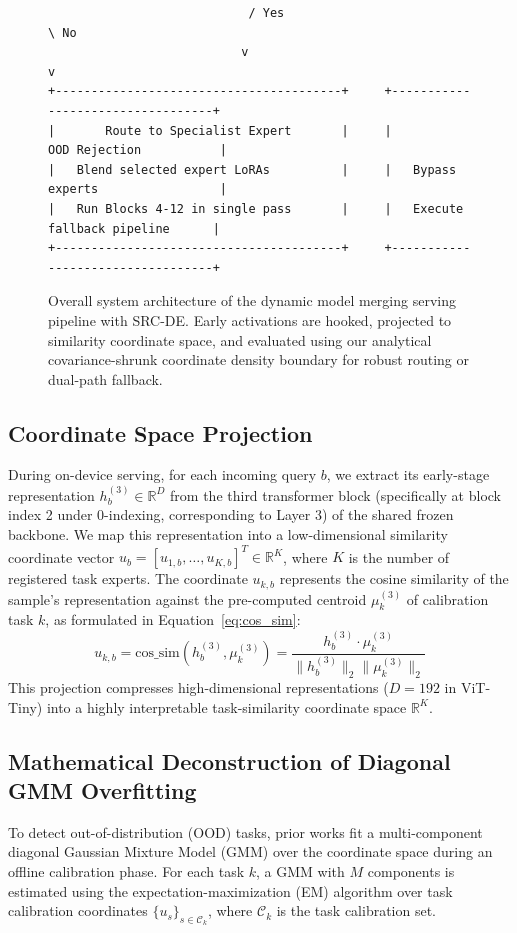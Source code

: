 \begin{figure}[htbp]
\begin{small}
\begin{verbatim}
                            / Yes                           \ No
                           v                                 v
+----------------------------------------+     +----------------------------------+
|       Route to Specialist Expert       |     |          OOD Rejection           |
|   Blend selected expert LoRAs          |     |   Bypass experts                 |
|   Run Blocks 4-12 in single pass       |     |   Execute fallback pipeline      |
+----------------------------------------+     +----------------------------------+
\end{verbatim}
\end{small}
\caption{Overall system architecture of the dynamic model merging serving pipeline with SRC-DE. Early activations are hooked, projected to similarity coordinate space, and evaluated using our analytical covariance-shrunk coordinate density boundary for robust routing or dual-path fallback.}
\label{fig:system_schematic}
\end{figure}

\subsection{Coordinate Space Projection}
During on-device serving, for each incoming query $b$, we extract its early-stage representation $h^{(3)}_b \in \mathbb{R}^D$ from the third transformer block (specifically at block index 2 under 0-indexing, corresponding to Layer 3) of the shared frozen backbone. We map this representation into a low-dimensional similarity coordinate vector $u_b = [u_{1, b}, \dots, u_{K, b}]^T \in \mathbb{R}^K$, where $K$ is the number of registered task experts. The coordinate $u_{k, b}$ represents the cosine similarity of the sample's representation against the pre-computed centroid $\mu^{(3)}_k$ of calibration task $k$, as formulated in Equation~\ref{eq:cos_sim}:
\begin{equation}
\label{eq:cos_sim}
    u_{k, b} = \text{cos\_sim}(h^{(3)}_b, \mu^{(3)}_k) = \frac{h^{(3)}_b \cdot \mu^{(3)}_k}{\|h^{(3)}_b\|_2 \|\mu^{(3)}_k\|_2}
\end{equation}
This projection compresses high-dimensional representations ($D=192$ in ViT-Tiny) into a highly interpretable task-similarity coordinate space $\mathbb{R}^K$.

\subsection{Mathematical Deconstruction of Diagonal GMM Overfitting}
To detect out-of-distribution (OOD) tasks, prior works fit a multi-component diagonal Gaussian Mixture Model (GMM) over the coordinate space during an offline calibration phase. For each task $k$, a GMM with $M$ components is estimated using the expectation-maximization (EM) algorithm over task calibration coordinates $\{u_s\}_{s \in \mathcal{C}_k}$, where $\mathcal{C}_k$ is the task calibration set.


